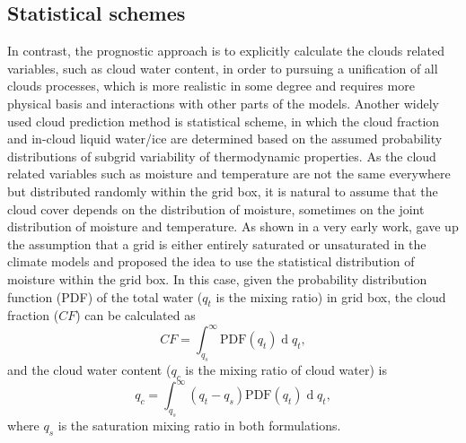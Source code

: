 \subsection{Statistical schemes}
\label{sec:PDF_cld_scheme}

In contrast, the prognostic approach \citep[e.g.,][]{Tiedtke1993} is to explicitly calculate the clouds related variables, such as cloud water content, in order to pursuing a unification of all clouds processes, which is more realistic in some degree and requires more physical basis and interactions with other parts of the models. Another widely used cloud prediction method is statistical scheme, in which the cloud fraction and in-cloud liquid water/ice are determined based on the assumed probability distributions of subgrid variability of thermodynamic properties. As the cloud related variables such as moisture and temperature are not the same everywhere but distributed randomly within the grid box, it is natural to assume that the cloud cover depends on the distribution of moisture, sometimes on the joint distribution of moisture and temperature. As shown in a very early work, \cite{Sommeria1977} gave up the assumption that a grid is either entirely saturated or unsaturated in the climate models and proposed the idea to use the statistical distribution of moisture within the grid box. In this case, given the probability distribution function (PDF) of the total water ($q_t$ is the mixing ratio) in grid box, the cloud fraction ($CF$) can be calculated as 
\begin{equation}
    CF=\int_{q_s}^{\infty}\text{PDF}(q_t)\operatorname{d}q_t,
\end{equation}
and the cloud water content ($q_c$ is the mixing ratio of cloud water) is
\begin{equation}
    q_c=\int_{q_s}^{\infty}(q_t-q_s)\text{PDF}(q_t)\operatorname{d}q_t,
\end{equation}
where $q_s$ is the saturation mixing ratio in both formulations.

